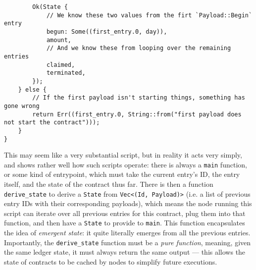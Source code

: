 \documentclass{extreport}
\begin{document}
\begin{verbatim}
        Ok(State {
            // We know these two values from the firt `Payload::Begin` entry
            begun: Some((first_entry.0, day)),
            amount,
            // And we know these from looping over the remaining entries
            claimed,
            terminated,
        });
    } else {
        // If the first payload isn't starting things, something has gone wrong
        return Err((first_entry.0, String::from("first payload does not start the contract")));
    }
}
\end{verbatim}

This may seem like a very substantial script, but in reality it acts very simply, and shows rather well how such scripts operate: there is always a \texttt{main} function, or some kind of entrypoint, which must take the current entry's ID, the entry itself, and the state of the contract thus far. There is then a function \texttt{derive\_state} to derive a \texttt{State} from \texttt{Vec<(Id, Payload)>} (i.e. a list of previous entry IDs with their corresponding payloads), which means the node running this script can iterate over all previous entries for this contract, plug them into that function, and then have a \texttt{State} to provide to \texttt{main}. This function encapsulates the idea of \emph{emergent state}: it quite literally emerges from all the previous entries. Importantly, the \texttt{derive\_state} function must be a \emph{pure function}, meaning, given the same ledger state, it must always return the same output --- this allows the state of contracts to be cached by nodes to simplify future executions.
\end{document}
